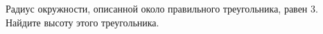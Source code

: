 \begin{ex}
	\begin{condition}
		Радиус окружности, описанной около правильного треугольника, равен \( 3 \). Найдите высоту этого треугольника.
	\end{condition}
\end{ex}